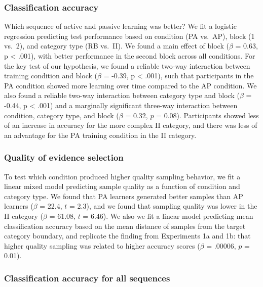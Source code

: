 \documentclass[10pt, letterpaper]{article}
\begin{document}
\subsubsection{Classification accuracy}\label{classification-accuracy-2}

Which sequence of active and passive learning was better? We fit a
logistic regression predicting test performance based on condition (PA
vs.~AP), block (1 vs.~2), and category type (RB vs.~II). We found a main
effect of block (\(\beta\) = 0.63, p \textless{} .001), with better
performance in the second block across all conditions. For the key test
of our hypothesis, we found a reliable two-way interaction between
training condition and block (\(\beta\) = -0.39, p \textless{} .001),
such that participants in the PA condition showed more learning over
time compared to the AP condition. We also found a reliable two-way
interaction between category type and block (\(\beta\) = -0.44, p
\textless{} .001) and a marginally significant three-way interaction
between condition, category type, and block (\(\beta\) = 0.32, \(p\) =
0.08). Participants showed less of an increase in accuracy for the more
complex II category, and there was less of an advantage for the PA
training condition in the II category.

\subsubsection{Quality of evidence
selection}\label{quality-of-evidence-selection}

To test which condition produced higher quality sampling behavior, we
fit a linear mixed model predicting sample quality as a function of
condition and category type. We found that PA learners generated better
samples than AP learners (\(\beta\) = 22.4, \(t\) = 2.3), and we found
that sampling quality was lower in the II category (\(\beta\) = 61.08,
\(t\) = 6.46). We also we fit a linear model predicting mean
classification accuracy based on the mean distance of samples from the
target category boundary, and replicate the finding from Experiments 1a
and 1b: that higher quality sampling was related to higher accuracy
scores (\(\beta\) = .00006, \(p\) = 0.01).

\subsubsection{Classification accuracy for all
sequences}\label{classification-accuracy-for-all-sequences}
\end{document}
